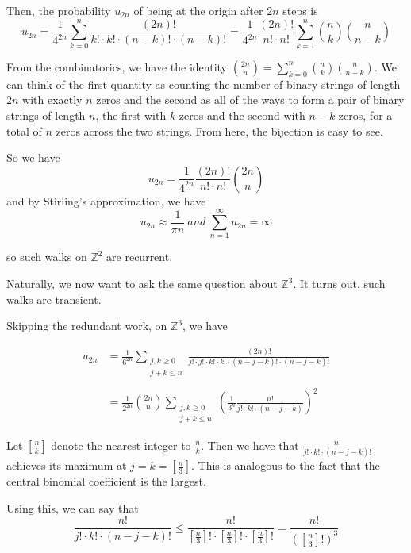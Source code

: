 Then, the probability $u_{2n}$ of being at the origin after $2n$ steps is 
$$u_{2n} = \frac{1}{4^{2n}} \sum\limits_{k=0}^n \frac{(2n)!}{k!\cdot k!\cdot (n-k)!\cdot (n-k)!} = \frac{1}{4^{2n}}\frac{(2n)!}{n!\cdot n!}\sum\limits_{k=1}^{n}\binom{n}{k}\binom{n}{n-k}$$

From the combinatorics, we have the identity $\binom{2n}{n} = \sum\limits_{k=0}^n \binom{n}{k}\binom{n}{n-k}$.  We can think of the first quantity as counting the number of binary strings of length $2n$ with exactly $n$ zeros and the second as all of the ways to form a pair of binary strings of length $n$, the first with $k$ zeros and the second with $n-k$ zeros, for a total of $n$ zeros across the two strings.  From here, the bijection is easy to see.

So we have $$u_{2n} = \frac{1}{4^{2n}}\frac{(2n)!}{n!\cdot n!}\binom{2n}{n}$$ and by Stirling's approximation, we have $$u_{2n}\approx \frac{1}{\pi n} \ and \ \sum\limits_{n=1}^{\infty} u_{2n} = \infty$$

so such walks on $\mathbb{Z}^2$ are recurrent.

Naturally, we now want to ask the same question about $\mathbb{Z}^3$.  It turns out, such walks are transient.


Skipping the redundant work, on $\mathbb{Z}^3$, we have 

\begin{align*}
u_{2n}&=\frac{1}{6^{2n}}\sum\limits_{\substack{j,k\geq 0 \\ j+k\leq n}} \frac{(2n)!}{j!\cdot j! \cdot k! \cdot k! \cdot (n-j-k)!\cdot (n-j-k)!}\\
\ \\
&= \frac{1}{2^{2n}}\binom{2n}{n}\sum\limits_{\substack{j,k\geq 0 \\ j+k\leq n}}  \left(\frac{1}{3^n}\frac{n!}{j!\cdot k!\cdot (n-j-k)}\right)^2
\end{align*}

Let $\left[\frac{n}{k}\right]$ denote the nearest integer to $\frac{n}{k}$.  Then we have that $\frac{n!}{j!\cdot k!\cdot (n-j-k)!}$ achieves its maximum at $j=k=\left[\frac{n}{3}\right]$.  This is analogous to the fact that the central binomial coefficient is the largest.

Using this, we can say that 
$$\frac{n!}{j!\cdot k!\cdot (n-j-k)!}\leq \frac{n!}{\left[\frac{n}{3}\right]!\cdot \left[\frac{n}{3}\right]!\cdot \left[\frac{n}{3}\right]!} = \frac{n!}{\left(\left[\frac{n}{3}\right]!\right)^3}$$


